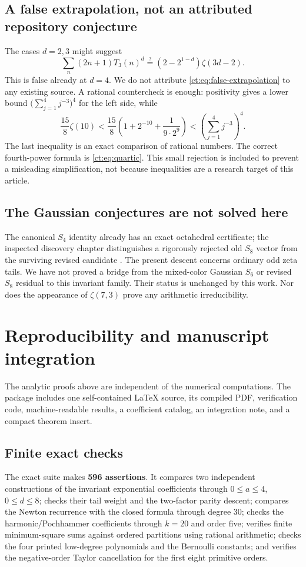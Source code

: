 \documentclass[11pt]{article}
\numberwithin{equation}{section}
\theoremstyle{definition}\newtheorem{definition}[theorem]{Definition}
\theoremstyle{remark}\newtheorem{remark}[theorem]{Remark}
\begin{document}
\subsection{A false extrapolation, not an attributed repository conjecture}
The cases $d=2,3$ might suggest
\begin{equation}\label{ct:eq:false-extrapolation}
 \sum_n(2n+1)T_3(n)^d\stackrel{?}{=}
       (2-2^{1-d})\zeta(3d-2).
\end{equation}
This is false already at $d=4$. We do not attribute
\eqref{ct:eq:false-extrapolation} to any existing source. A rational
countercheck is enough: positivity gives a lower bound
$\bigl(\sum_{j=1}^{4}j^{-3}\bigr)^4$ for the left side, while
\[
 \frac{15}{8}\zeta(10)
   <\frac{15}{8}\left(1+2^{-10}+\frac1{9\cdot2^9}\right)
   <\left(\sum_{j=1}^{4}j^{-3}\right)^4.
\]
The last inequality is an exact comparison of rational numbers. The correct
fourth-power formula is \eqref{ct:eq:quartic}. This small rejection is
included to prevent a misleading simplification, not because inequalities
are a research target of this article.

\subsection{The Gaussian conjectures are not solved here}
The canonical $S_4$ identity already has an exact octahedral certificate;
the inspected discovery chapter distinguishes a rigorously rejected old
$S_8$ vector from the surviving revised candidate \cite{ct:repo-status}.
The present descent concerns ordinary odd zeta tails. We have not proved a
bridge from the mixed-color Gaussian $S_6$ or revised $S_8$ residual to this
invariant family. Their status is unchanged by this work. Nor does the
appearance of $\zeta(7,3)$ prove any arithmetic irreducibility.

\section{Reproducibility and manuscript integration}
\label{ct:sec:verification}
The analytic proofs above are independent of the numerical computations.
The package includes one self-contained \LaTeX{} source, its compiled PDF,
verification code, machine-readable results, a coefficient catalog, an
integration note, and a compact theorem insert.

\subsection{Finite exact checks}
The exact suite makes \textbf{596 assertions}. It compares two independent
constructions of the invariant exponential coefficients through
$0\le a\le4$, $0\le d\le8$; checks their tail weight and the two-factor
parity descent; compares the Newton recurrence with the closed formula
through degree $30$; checks the harmonic/Pochhammer coefficients through
$k=20$ and order five; verifies finite minimum-square sums against ordered
partitions using rational arithmetic; checks the four printed low-degree
polynomials and the Bernoulli constants; and verifies the negative-order
Taylor cancellation for the first eight primitive orders.
\end{document}
